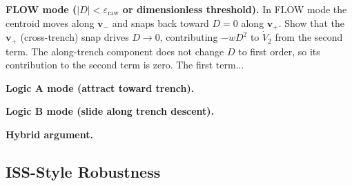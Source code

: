 \documentclass[lettersize,journal]{IEEEtran}
\begin{document}

\textbf{FLOW mode ($|D| < \varepsilon_{\text{raw}}$ or dimensionless threshold).}
In FLOW mode the centroid moves along $\mathbf{v}_-$ and snaps back toward
$D = 0$ along $\mathbf{v}_+$. Show that the $\mathbf{v}_+$ (cross-trench)
snap drives $D \to 0$, contributing $-w D^2$ to $\dot{V}_2$ from the second
term. The along-trench component does not change $D$ to first order, so its
contribution to the second term is zero. The first term...


\textbf{Logic A mode (attract toward trench).}


\textbf{Logic B mode (slide along trench descent).}


\textbf{Hybrid argument.}


\subsection{ISS-Style Robustness}
\label{sec:stab_iss}

\end{document}
